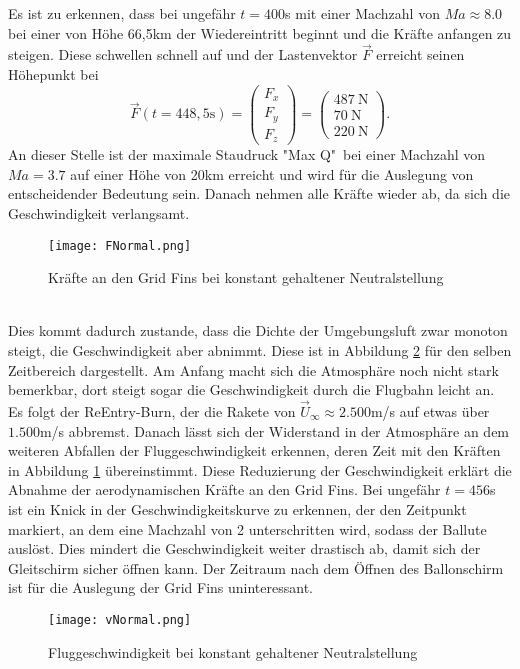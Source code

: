 Es ist zu erkennen, dass bei ungefähr $t=400$s mit einer Machzahl von $Ma \approx 8.0$ bei einer von Höhe 66,5km  der Wiedereintritt beginnt und die Kräfte anfangen zu steigen. Diese schwellen schnell auf und der Lastenvektor $\vec{F}$ erreicht seinen Höhepunkt bei
\begin{equation}
	\vec{F}(t=448,5\mathrm{s})=
		\left(\begin{array}{c}F_{x}\\F_y\\F_z\end{array}\right)
			=\left(\begin{array}{r}487\mathrm{\ N}\\70\mathrm{\ N}\\220\mathrm{\ N}\end{array}\right).
\end{equation}
An dieser Stelle ist der maximale Staudruck "Max Q"\ bei einer Machzahl von $Ma = 3.7$ auf einer Höhe von 20km erreicht und wird für die Auslegung von entscheidender Bedeutung sein. Danach nehmen alle Kräfte wieder ab, da sich die Geschwindigkeit verlangsamt. 
\begin{figure}[h]
	\centering
	\texttt{[image: FNormal.png]}
	\caption{Kräfte an den Grid Fins bei konstant gehaltener Neutralstellung}
	\label{abb_KraefteNormal}
\end{figure}\\
Dies kommt dadurch zustande, dass die Dichte der Umgebungsluft zwar monoton steigt, die Geschwindigkeit aber abnimmt. Diese ist in Abbildung \ref{abb_vNormal} für den selben Zeitbereich dargestellt. Am Anfang macht sich die Atmosphäre noch nicht stark bemerkbar, dort steigt sogar die Geschwindigkeit durch die Flugbahn leicht an. Es folgt der ReEntry-Burn, der die Rakete von $\vec{U}_\infty \approx 2.500$m/s auf etwas über $1.500$m/s abbremst. Danach lässt sich der Widerstand in der Atmosphäre an dem weiteren Abfallen der Fluggeschwindigkeit erkennen, deren Zeit mit den Kräften in Abbildung \ref{abb_KraefteNormal} übereinstimmt. Diese Reduzierung der Geschwindigkeit erklärt die Abnahme der aerodynamischen Kräfte an den Grid Fins. Bei ungefähr $t=456$s ist ein Knick in der Geschwindigkeitskurve zu erkennen, der den Zeitpunkt markiert, an dem eine Machzahl von 2 unterschritten wird, sodass der Ballute auslöst. Dies mindert die Geschwindigkeit weiter drastisch ab, damit sich der Gleitschirm sicher öffnen kann. Der Zeitraum nach dem Öffnen des Ballonschirm ist für die Auslegung der Grid Fins uninteressant.
\begin{figure}[h]
	\centering
	\texttt{[image: vNormal.png]}
	\caption{Fluggeschwindigkeit bei konstant gehaltener Neutralstellung}
	\label{abb_vNormal}
\end{figure}\\~\\
